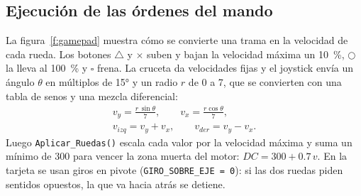 \documentclass[conference,letterpaper]{IEEEtran}
\begin{document}
\subsection{Ejecución de las órdenes del mando}

La figura~\ref{f:gamepad} muestra cómo se convierte una trama en la velocidad
de cada rueda. Los botones $\triangle$ y $\times$ suben y bajan la velocidad
máxima un \SI{10}{\percent}, $\bigcirc$ la lleva al \SI{100}{\percent} y
$\square$ frena. La cruceta da velocidades fijas y el joystick envía un ángulo
$\theta$ en múltiplos de \ang{15} y un radio $r$ de 0 a 7, que se convierten
con una tabla de senos y una mezcla diferencial:
\begin{gather}
  v_y = \frac{r\,\sin\theta}{7},\qquad v_x = \frac{r\cos\theta}{7},\\
  v_{izq} = v_y + v_x,\qquad v_{der} = v_y - v_x.
\end{gather}
Luego \texttt{Aplicar\_Ruedas()} escala cada valor por la velocidad máxima y
suma un mínimo de 300 para vencer la zona muerta del motor:
$DC = 300 + 0.7\,v$. En la tarjeta se usan giros en pivote
(\texttt{GIRO\_SOBRE\_EJE = 0}): si las dos ruedas piden sentidos opuestos, la
que va hacia atrás se detiene.
\end{document}
